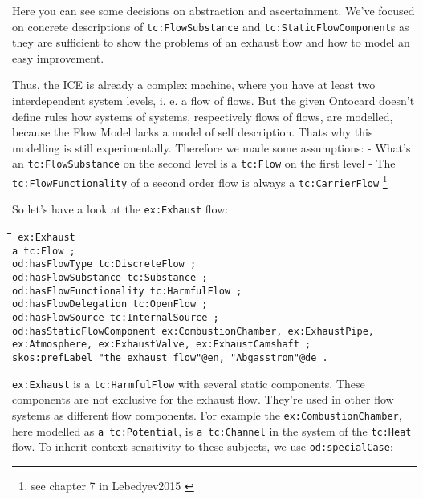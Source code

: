 \documentclass[a4paper,11pt]{article}
\newenvironment{code}{\tt \begin{tabbing}
\hskip12pt\=\hskip12pt\=\hskip12pt\=\hskip12pt\=\hskip5cm\=\hskip5cm\=\kill}
{\end{tabbing}}
\begin{document}
    Here you can see some decisions on abstraction and ascertainment. We've
    focused on concrete descriptions of \texttt{tc:FlowSubstance} and
    \texttt{tc:StaticFlowComponent}s as they are sufficient to show the 
    problems of an exhaust flow and how to model an easy improvement.

    Thus, the ICE is already a complex machine, where you have at least
    two interdependent system levels, i. e. a flow of flows. But the given 
    Ontocard doesn't define rules how systems of systems, respectively flows 
    of flows, are modelled, because the Flow Model lacks a model of self 
    description. Thats why this modelling is still experimentally. Therefore we
    made some assumptions:
    - What's an \texttt{tc:FlowSubstance} on the second level is a 
    \texttt{tc:Flow} on the first level
    - The \texttt{tc:FlowFunctionality} of a second order flow is always a 
    \texttt{tc:CarrierFlow} \footnote{see chapter 7 in Lebedyev2015 
    \cite{Lebedyev2015} }

    So let's have a look at the \texttt{ex:Exhaust} flow:
    \begin{code}\tt
        ex:Exhaust \\
        \> a tc:Flow ; \\
        \> od:hasFlowType tc:DiscreteFlow ; \\
        \> od:hasFlowSubstance tc:Substance ; \\
        \> od:hasFlowFunctionality tc:HarmfulFlow ; \\
        \> od:hasFlowDelegation tc:OpenFlow ; \\
        \> od:hasFlowSource tc:InternalSource ; \\
        \> od:hasStaticFlowComponent ex:CombustionChamber, ex:ExhaustPipe, \\
        \> ex:Atmosphere, ex:ExhaustValve, ex:ExhaustCamshaft ; \\
        \> skos:prefLabel "the exhaust flow"@en, "Abgasstrom"@de . \\
    \end{code}

    \texttt{ex:Exhaust} is a \texttt{tc:HarmfulFlow} with several static 
    components. These components are not exclusive for the exhaust flow.
    They're used in other flow systems as different flow components. For
    example the \texttt{ex:CombustionChamber}, here modelled as
    \texttt{a tc:Potential}, is \texttt{a tc:Channel} in the system of the
    \texttt{tc:Heat} flow. To inherit context sensitivity to these 
    subjects, we use \texttt{od:specialCase}: \cite{RDFC}
    
\end{document}
